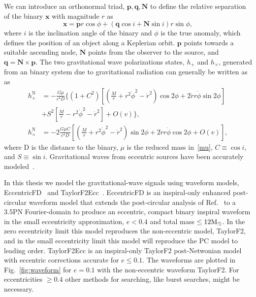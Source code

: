 We can introduce an orthonormal triad, $\boldsymbol{p},\boldsymbol{q}, \boldsymbol{N}$ to define the relative separation of the binary $\boldsymbol{x}$ with magnitude $r$ as
\begin{equation}
    \boldsymbol{x} = \boldsymbol{p}r\cos\phi + (\boldsymbol{q}\cos i + \boldsymbol{N}\sin i)r\sin\phi, 
\end{equation}
where $i$ is the inclination angle of the binary and $\phi$ is the true anomaly, which defines the position of an object along a Keplerian orbit. $\boldsymbol{p}$ points towards a suitable ascending node, $\boldsymbol{N}$ points from the observer to the source, and $\boldsymbol{q} = \boldsymbol{N} \times \boldsymbol{p}$.
The two gravitational wave polarizations states, $h_+$ and $h_\times$, generated from an binary system due to gravitational radiation can generally be written as~\cite{Damour:2004bz} as~\cite{Damour:2004bz}
\begin{equation}
    \begin{aligned}
        h_{+}^{\mathrm{N}}&=-\frac{G\mu}{c^4D}\Bigg\{\left(1+C^{2}\right)\left[\left(\frac{M}{r}+r^{2} \dot{\phi}^{2}-\dot{r}^{2}\right) \cos 2 \phi+2 \dot{r} r \dot{\phi} \sin 2 \phi\right] \\ 
        &+S^{2}\left[\frac{M}{r}-r^{2} \dot{\phi}^{2}-\dot{r}^{2}\right]+O(v)\Bigg\}, \\
        h_{\times}^{\mathrm{N}}&=-2 \frac{G\mu C}{c^4D}\left[\left(\frac{M}{r}+r^{2} \dot{\phi}^{2}-\dot{r}^{2}\right) \sin 2 \phi+2 \dot{r} r \dot{\phi} \cos 2 \phi+O(v)\right],
    \end{aligned}
\end{equation}
where D is the distance to the binary, $\mu$ is the reduced mass in~\ref{mu}, $C \equiv \cos i$, and $S \equiv \sin i$. Gravitational waves from eccentric sources have been accurately modeled~\cite{Huerta:2014eca,Tanay:2016zog,Moore:2016qxz,Huerta:2016rwp,Cao:2017ndf,Hinder:2017sxy,Tiwari:2019jtz,Moore:2019xkm}. 

In this thesis we model the gravitational-wave signals using waveform models, EccentricFD~\cite{Huerta:2014eca} and TaylorF2Ecc~\cite{Moore:2016qxz}. EccentricFD is an inspiral-only enhanced post-circular waveform model that extends the post-circular analysis of Ref.~\cite{Yunes:2009yz} to a 3.5PN Fourier-domain to produce an eccentric, compact binary inspiral waveform in the small eccentricity approximation, $e < 0.4$ and total mass $\leq 12\mathrm{M}_{\odot}$. In the zero eccentricity limit this model reproduces the non-eccentric model, TaylorF2, and in the small eccentricity limit this model will reproduce the PC model to leading order. TaylorF2Ecc is an inspiral-only TaylorF2 post-Netwonian model with eccentric corrections accurate for $e \leq 0.1$. The waveforms are plotted in Fig.~\ref{fig:waveform} for $e=0.1$ with the non-eccentric waveform TaylorF2. For eccentricities $\geq 0.4$ other methods for searching, like burst searches, might be necessary.

